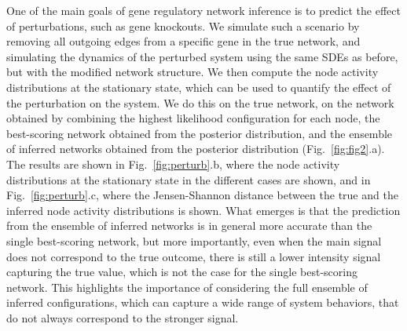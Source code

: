 \documentclass[10pt, aps, rmp,  twocolumn, superscriptaddress, floatfix, showkeys]{revtex4-2}
\begin{document}
One of the main goals of gene regulatory network inference is to 
predict the effect of perturbations, such as gene knockouts. 
We simulate such a scenario by removing all outgoing edges from a specific gene in the true network, and simulating the dynamics of the perturbed system using the same SDEs as before, but with the modified network structure. We then compute the node activity distributions at the stationary state, which can be used to quantify the effect of the perturbation on the system. We do this on the true network, on the network obtained by combining the highest likelihood configuration for each node, the best-scoring network obtained from the posterior distribution, and the ensemble of inferred networks obtained from the posterior distribution (Fig.~\ref{fig:fig2}.a). 
The results are shown in Fig.~\ref{fig:perturb}.b, where the node activity distributions at the stationary state in the different cases are shown, and in Fig.~\ref{fig:perturb}.c, where the Jensen-Shannon distance between the true and the inferred node 
activity distributions is shown. 
What emerges is that the prediction from the ensemble of inferred networks is in general more accurate than the single best-scoring network, but more importantly, even when the main signal does not correspond to the true outcome, there is still a lower intensity signal capturing the true value, which is not the case for the single best-scoring network. This highlights the importance of considering the full ensemble of inferred configurations, which can capture a wide range of system behaviors, that do not always correspond to the stronger signal.
\end{document}
